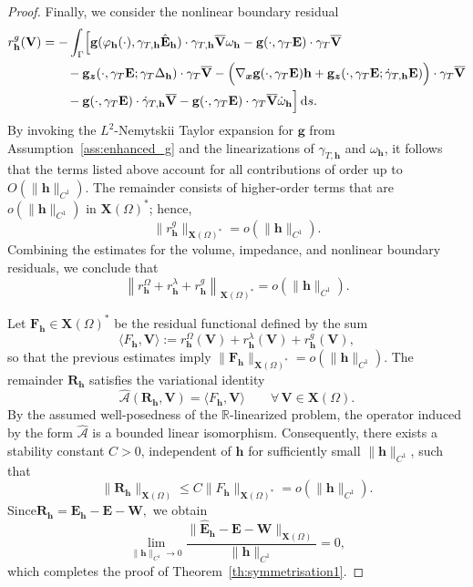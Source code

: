 \documentclass[10pt,a4paper]{amsart}
\numberwithin{equation}{section}
\begin{document}
\begin{proof}
Finally, we consider the nonlinear boundary residual
\[
\begin{aligned}
r_{\mathbf{h}}^{g}(\mathbf{V}) &= - \int_\Gamma \Bigl[ \mathbf{g}(\varphi_{\mathbf{h}}(\cdot), \gamma_{T,\mathbf{h}}\hat{\mathbf{E}}_{\mathbf{h}}) \cdot \gamma_{T,\mathbf{h}}\overline{\mathbf{V}} \omega_{\mathbf{h}} - \mathbf{g}(\cdot,\gamma_T\mathbf{E}) \cdot \gamma_T\overline{\mathbf{V}} \\
&\qquad - \mathbf{g}_{\boldsymbol{z}}(\cdot,\gamma_T\mathbf{E};\gamma_T\Delta_{\mathbf{h}}) \cdot \gamma_T\overline{\mathbf{V}} - \Bigl( \nabla_{\boldsymbol{x}}\mathbf{g}(\cdot,\gamma_T\mathbf{E})\mathbf{h} + \mathbf{g}_{\boldsymbol{z}}(\cdot,\gamma_T\mathbf{E}; \dot{\gamma}_{T,\mathbf{h}}\mathbf{E}) \Bigr) \cdot \gamma_T\overline{\mathbf{V}} \\
&\qquad - \mathbf{g}(\cdot,\gamma_T\mathbf{E}) \cdot \dot{\gamma}_{T,\mathbf{h}}\overline{\mathbf{V}} - \mathbf{g}(\cdot,\gamma_T\mathbf{E}) \cdot \gamma_T\overline{\mathbf{V}} \dot{\omega}_{\mathbf{h}} \Bigr] \,\mathrm{d}s.
\end{aligned}
\]
By invoking the $L^2$-Nemytskii Taylor expansion for $\mathbf{g}$ from Assumption~\ref{ass:enhanced_g} and the linearizations of $\gamma_{T,\mathbf{h}}$ and $\omega_{\mathbf{h}}$, it follows that the terms listed above account for all contributions of order up to $O(\|\mathbf{h}\|_{C^1})$. The remainder consists of higher-order terms that are $o(\|\mathbf{h}\|_{C^1})$ in $\mathbf{X}(\Omega)^*$; hence,
\[
\|r_{\mathbf{h}}^{g}\|_{\mathbf{X}(\Omega)^*} = o(\|\mathbf{h}\|_{C^1}).
\]
Combining the estimates for the volume, impedance, and nonlinear boundary residuals, we conclude that
\[
\left\| r_{\mathbf{h}}^{\Omega} + r_{\mathbf{h}}^{\lambda} + r_{\mathbf{h}}^{g} \right\|_{\mathbf{X}(\Omega)^*} = o(\|\mathbf{h}\|_{C^1}).
\]


Let $\mathbf{F}_{\mathbf{h}} \in \mathbf{X}(\Omega)^*$ be the residual functional defined by the sum
\[
\langle {F}_{\mathbf{h}}, \mathbf{V} \rangle := r_{\mathbf{h}}^{\Omega}(\mathbf{V}) + r_{\mathbf{h}}^{\lambda}(\mathbf{V}) + r_{\mathbf{h}}^{g}(\mathbf{V}),
\]
so that the previous estimates imply $\|\mathbf{F}_{\mathbf{h}}\|_{\mathbf{X}(\Omega)^*} = o(\|\mathbf{h}\|_{C^1})$. The remainder $\mathbf{R}_{\mathbf{h}}$ satisfies the variational identity
\[
\widehat{\mathcal{A}}(\mathbf{R}_{\mathbf{h}}, \mathbf{V}) = \langle {F}_{\mathbf{h}}, \mathbf{V} \rangle \qquad \forall \, \mathbf{V} \in \mathbf{X}(\Omega).
\]
By the assumed well-posedness of the $\mathbb{R}$-linearized problem, the operator induced by the form $\widehat{\mathcal{A}}$ is a bounded linear isomorphism. Consequently, there exists a stability constant $C > 0$, independent of $\mathbf{h}$ for sufficiently small $\|\mathbf{h}\|_{C^1}$, such that
\[
\|\mathbf{R}_{\mathbf{h}}\|_{\mathbf{X}(\Omega)} \le C \|{F}_{\mathbf{h}}\|_{\mathbf{X}(\Omega)^*} = o(\|\mathbf{h}\|_{C^1}).
\]
Since$
\mathbf R_{\mathbf h}
=\hat{\mathbf E}_{\mathbf h}-\mathbf E-\mathbf W,
$
we obtain
\[
\lim_{\|\mathbf h\|_{C^1}\to0}
\frac{\|\hat{\mathbf E}_{\mathbf h}-\mathbf E-\mathbf W\|_{\mathbf X(\Omega)}
}{\|\mathbf h\|_{C^1}}=0,
\]
which completes the proof of Theorem~\ref{th:symmetrisation1}.
\end{proof}
\end{document}

